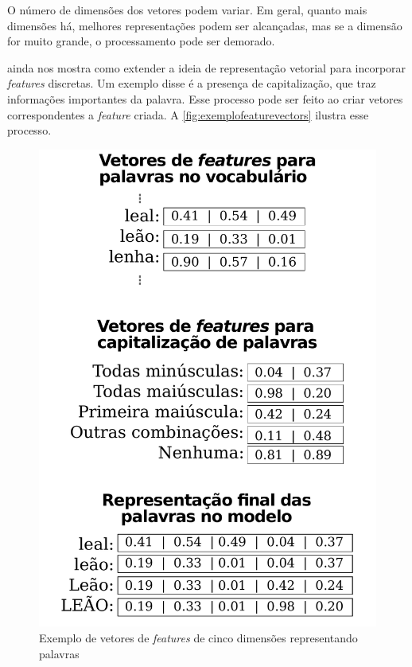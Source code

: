 O número de dimensões dos vetores podem variar. Em geral, quanto mais dimensões há, melhores representações podem ser alcançadas, mas se a dimensão for muito grande, o processamento pode ser demorado.

\cite{collobert2011natural} ainda nos mostra como extender a ideia de representação vetorial para incorporar \textit{features} discretas. Um exemplo disse é a presença de capitalização, que traz informações importantes da palavra. Esse processo pode ser feito ao criar vetores correspondentes a \textit{feature} criada. A \autoref{fig:exemplofeaturevectors} ilustra esse processo.

\begin{figure}[htb]
  \caption{Exemplo de vetores de \textit{features} de cinco dimensões representando palavras} \label{fig:exemplofeaturevectors}
  \begin{center}
      \includegraphics[scale=0.35]{img/exemplofeaturevectors.pdf}
  \end{center}
\end{figure}

